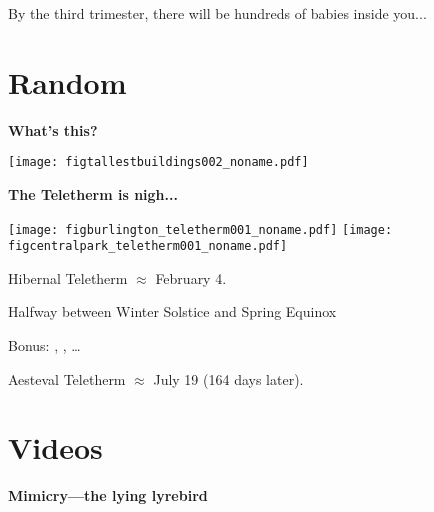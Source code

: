   {By the third trimester, there will be hundreds of babies inside you...}

\section{Random}


  \textbf{What's this?}
  
  \texttt{[image: figtallestbuildings002\_noname.pdf]}





  \textbf{The Teletherm is nigh...}
    \begin{center}
    \texttt{[image: figburlington\_teletherm001\_noname.pdf]}
    \texttt{[image: figcentralpark\_teletherm001\_noname.pdf]}
    \end{center}
    
     
      Hibernal Teletherm $\approx$ February 4.
     
      Halfway between Winter Solstice and Spring Equinox
     
      Bonus: , 
      , \ldots
     
      Aesteval Teletherm $\approx$ July 19 (164 days later).
    
  



\section{Videos}

  \textbf{Mimicry---the lying lyrebird}

  \begin{center}
  \end{center}





